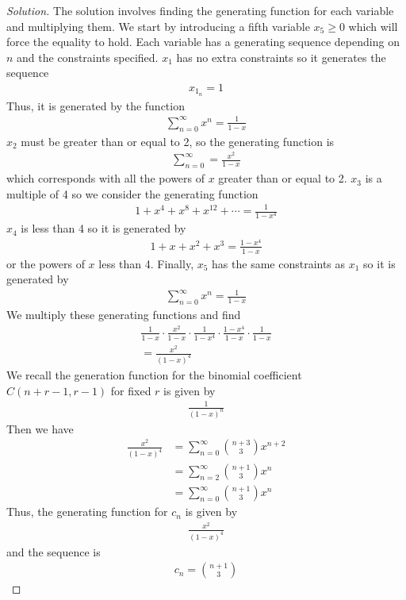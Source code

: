 \documentclass[12pt]{article}
\theoremstyle{definition}
\newenvironment{solution}{
  \begin{proof}[Solution]
    \vspace{-8px}
    \setlength{\parskip}{4px}
    \setlength{\parindent}{0px}
}{
\end{proof}
}
\begin{document}
  \begin{solution}
    The solution involves finding the generating function for each variable and multiplying them.
    We start by introducing a fifth variable \(x_5 \geq 0\) which will force the equality to hold.
    Each variable has a generating sequence depending on \(n\) and the constraints specified.
    \(x_1\) has no extra constraints so it generates the sequence
    \begin{align*}
      x_{1_{n}} = 1
    \end{align*}
    Thus, it is generated by the function
    \begin{align*}
      \sum_{n=0}^{\infty} x^n = \frac{1}{1 - x}
    \end{align*}
    \(x_2\) must be greater than or equal to 2, so the generating function is
    \begin{align*}
      \sum_{n=0}^{\infty} = \frac{x^2}{1 - x}
    \end{align*}
    which corresponds with all the powers of \(x\) greater than or equal to 2.
    \(x_3\) is a multiple of 4 so we consider the generating function
    \begin{align*}
      1 + x^4 + x^8 + x^{12} + \cdots = \frac{1}{1 - x^4}
    \end{align*}
    \(x_4\) is less than 4 so it is generated by
    \begin{align*}
      1 + x + x^2 + x^3 = \frac{1 - x^4}{1 - x}
    \end{align*}
    or the powers of \(x\) less than 4.
    Finally, \(x_5\) has the same constraints as \(x_1\) so it is generated by
    \begin{align*}
      \sum_{n = 0}^{\infty} x^n = \frac{1}{1 - x}
    \end{align*}
    We multiply these generating functions and find
    \begin{gather*}
      \frac{1}{1 - x} \cdot \frac{x^2}{1 - x} \cdot \frac{1}{1 - x^4} \cdot \frac{1 - x^4}{1 - x} \cdot \frac{1}{1 - x} \\
      = \frac{x^2}{(1 - x)^4}
    \end{gather*}
    We recall the generation function for the binomial coefficient \(C(n+r-1, r-1)\) for fixed \(r\) is given by
    \begin{align*}
      \frac{1}{(1 - x)^n}
    \end{align*}
    Then we have
    \begin{align*}
      \frac{x^2}{(1 - x)^4} &= \sum_{n = 0}^{\infty} {n + 3 \choose 3} x^{n+2} \\
      &= \sum_{n=2}^{\infty} {n + 1 \choose 3} x^n \\
      &= \sum_{n=0}^{\infty} {n + 1 \choose 3} x^n
    \end{align*}
    Thus, the generating function for \(c_n\) is given by
    \begin{align*}
      \frac{x^2}{(1 - x)^4}
    \end{align*}
    and the sequence is
    \begin{align*}
      c_n = {n + 1 \choose 3}
    \end{align*}
  \end{solution}
\end{document}
